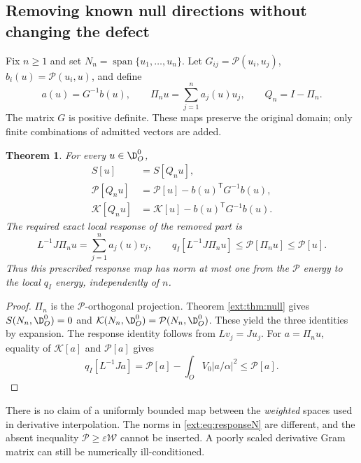 \documentclass[11pt,a4paper]{article}
\numberwithin{equation}{section}
\newtheorem{theorem}{Theorem}[section]
\theoremstyle{definition}\newtheorem{definition}[theorem]{Definition}
\theoremstyle{remark}\newtheorem{remark}[theorem]{Remark}
\begin{document}
\subsection{Removing known null directions without changing the defect}
Fix $n\ge1$ and set $N_n=\operatorname{span}\{u_1,\ldots,u_n\}$.
Let $G_{ij}=\mathcal P(u_i,u_j)$, $b_i(u)=\mathcal P(u_i,u)$, and define
\begin{equation}\label{ext:eq:projection}
 a(u)=G^{-1}b(u),\qquad
 \Pi_nu=\sum_{j=1}^n a_j(u)u_j,\qquad Q_n=I-\Pi_n.
\end{equation}
The matrix $G$ is positive definite. These maps preserve the original domain; only finite combinations of admitted vectors are added.

\begin{theorem}\label{ext:thm:deflate}
For every $u\in\D_O^0$,
\begin{align}
 S[u]&=S[Q_nu],\label{ext:eq:Sdeflate}\\
 \mathcal P[Q_nu]&=\mathcal P[u]-b(u)^{\mathsf T}G^{-1}b(u),\label{ext:eq:Pdeflate}\\
 \mathcal K[Q_nu]&=\mathcal K[u]-b(u)^{\mathsf T}G^{-1}b(u).\label{ext:eq:Kdeflate}
\end{align}
The required exact local response of the removed part is
\begin{equation}\label{ext:eq:responseN}
 L^{-1}J\Pi_nu=\sum_{j=1}^n a_j(u)v_j,
 \qquad
 q_I[L^{-1}J\Pi_nu]\le\mathcal P[\Pi_nu]\le\mathcal P[u].
\end{equation}
Thus this prescribed response map has norm at most one from the $\mathcal P$ energy to the local $q_I$ energy, independently of $n$.
\end{theorem}
\begin{proof}
$\Pi_n$ is the $\mathcal P$-orthogonal projection. Theorem \ref{ext:thm:null} gives $S(N_n,\D_O^0)=0$ and $\mathcal K(N_n,\D_O^0)=\mathcal P(N_n,\D_O^0)$. These yield the three identities by expansion. The response identity follows from $Lv_j=Ju_j$. For $a=\Pi_nu$, equality of $\mathcal K[a]$ and $\mathcal P[a]$ gives
\[
 q_I[L^{-1}Ja]=\mathcal P[a]-\int_O V_0|a/\alpha|^2\le\mathcal P[a].
\]
\end{proof}
There is no claim of a uniformly bounded map between the \emph{weighted} spaces used in derivative interpolation. The norms in \eqref{ext:eq:responseN} are different, and the absent inequality $\mathcal P\ge\varepsilon\mathcal W$ cannot be inserted. A poorly scaled derivative Gram matrix can still be numerically ill-conditioned.
\end{document}
